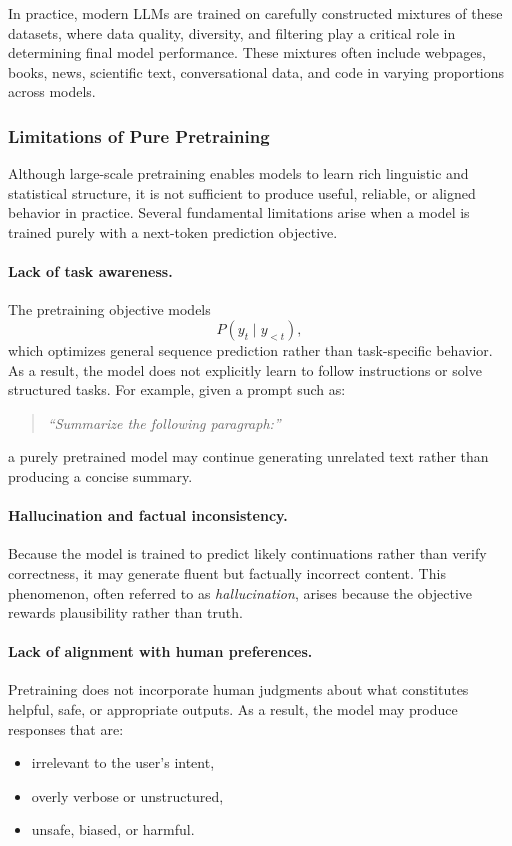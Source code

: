 \documentclass{article}
\begin{document}
In practice, modern LLMs are trained on carefully constructed mixtures of these datasets, where data quality, diversity, and filtering play a critical role in determining final model performance. These mixtures often include webpages, books, news, scientific text, conversational data, and code in varying proportions across models.

\subsubsection{Limitations of Pure Pretraining}

Although large-scale pretraining enables models to learn rich linguistic and statistical structure, it is not sufficient to produce useful, reliable, or aligned behavior in practice. Several fundamental limitations arise when a model is trained purely with a next-token prediction objective.

\paragraph{Lack of task awareness.}
The pretraining objective models
\[
P(y_t \mid y_{<t}),
\]
which optimizes general sequence prediction rather than task-specific behavior. As a result, the model does not explicitly learn to follow instructions or solve structured tasks. For example, given a prompt such as:
\begin{quote}
\textit{“Summarize the following paragraph:”}
\end{quote}
a purely pretrained model may continue generating unrelated text rather than producing a concise summary.

\paragraph{Hallucination and factual inconsistency.}
Because the model is trained to predict likely continuations rather than verify correctness, it may generate fluent but factually incorrect content. This phenomenon, often referred to as \emph{hallucination}, arises because the objective rewards plausibility rather than truth.

\paragraph{Lack of alignment with human preferences.}
Pretraining does not incorporate human judgments about what constitutes helpful, safe, or appropriate outputs. As a result, the model may produce responses that are:
\begin{itemize}
    \item irrelevant to the user’s intent,
    \item overly verbose or unstructured,
    \item unsafe, biased, or harmful.
\end{itemize}
\end{document}
